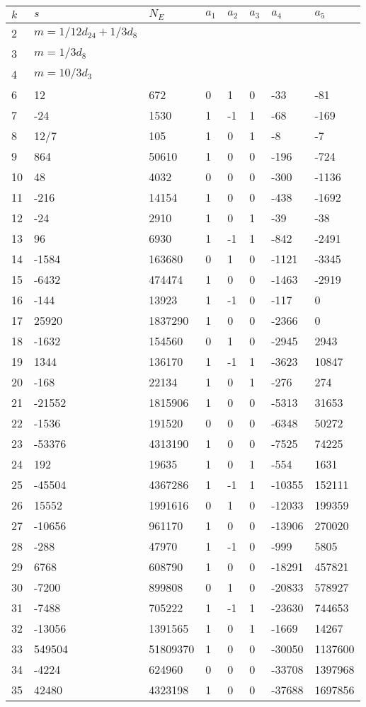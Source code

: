 \documentclass{amsart}
\begin{document}
\begin{longtable}{|l|l|l|lllll|}
\hline
$k$ & $s$ & $N_E$ & $a_1$ & $a_2$ & $a_3$ & $a_4$ & $a_5$\\
\hline
2&$m=1/12d_{24}+1/3d_{8}$&&\multicolumn{5}{c|}{}\\
3&$m=1/3d_{8}$&&\multicolumn{5}{c|}{}\\
4&$m=10/3d_{3}$&&\multicolumn{5}{c|}{}\\
6&12&672&0&1&0&-33&-81\\
7&-24&1530&1&-1&1&-68&-169\\
8&12/7&105&1&0&1&-8&-7\\
9&864&50610&1&0&0&-196&-724\\
10&48&4032&0&0&0&-300&-1136\\
11&-216&14154&1&0&0&-438&-1692\\
12&-24&2910&1&0&1&-39&-38\\
13&96&6930&1&-1&1&-842&-2491\\
14&-1584&163680&0&1&0&-1121&-3345\\
15&-6432&474474&1&0&0&-1463&-2919\\
16&-144&13923&1&-1&0&-117&0\\
17&25920&1837290&1&0&0&-2366&0\\
18&-1632&154560&0&1&0&-2945&2943\\
19&1344&136170&1&-1&1&-3623&10847\\
20&-168&22134&1&0&1&-276&274\\
21&-21552&1815906&1&0&0&-5313&31653\\
22&-1536&191520&0&0&0&-6348&50272\\
23&-53376&4313190&1&0&0&-7525&74225\\
24&192&19635&1&0&1&-554&1631\\
25&-45504&4367286&1&-1&1&-10355&152111\\
26&15552&1991616&0&1&0&-12033&199359\\
27&-10656&961170&1&0&0&-13906&270020\\
28&-288&47970&1&-1&0&-999&5805\\
29&6768&608790&1&0&0&-18291&457821\\
30&-7200&899808&0&1&0&-20833&578927\\
31&-7488&705222&1&-1&1&-23630&744653\\
32&-13056&1391565&1&0&1&-1669&14267\\
33&549504&51809370&1&0&0&-30050&1137600\\
34&-4224&624960&0&0&0&-33708&1397968\\
35&42480&4323198&1&0&0&-37688&1697856\\

\end{longtable}
\end{document}
